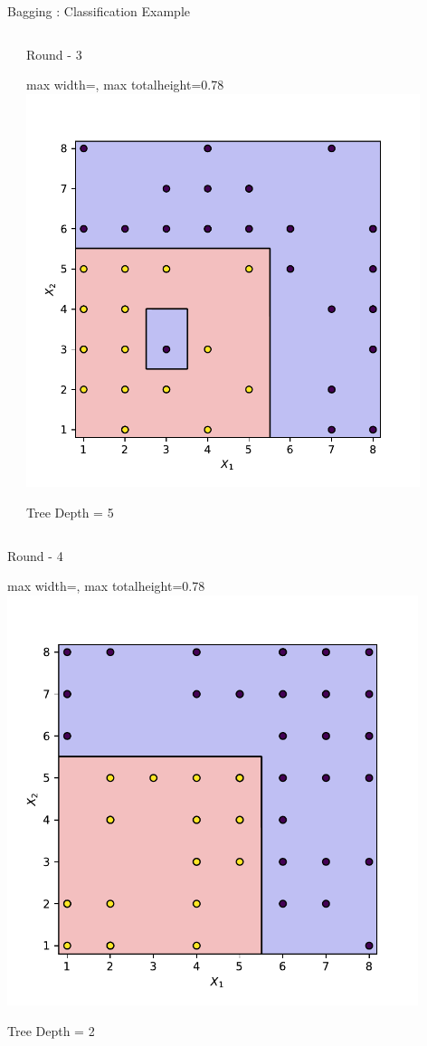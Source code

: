 \documentclass[10pt]{beamer}
\newcommand{\fitpic}[1]{\begin{adjustbox}{max width=\linewidth, max totalheight=0.78\textheight}#1\end{adjustbox}}
\begin{document}
\begin{frame}{Bagging : Classification Example}
\begin{columns}
\begin{column}{0.3\textwidth}
    \end{column}
    \pause  \begin{column}{0.3\textwidth}
      \centering
      Round - 3\\

      \fitpic{\includegraphics[width = 0.9\textwidth]{../assets/ensemble/figures/decision-boundary-2}}
      Tree Depth = 5

    \end{column}

  \end{columns}
  \vspace{0.5cm}
  \pause  \begin{columns}
    \begin{column}{0.3\textwidth}
      \centering
      Round - 4\\

      \fitpic{\includegraphics[width = 0.9\textwidth]{../assets/ensemble/figures/decision-boundary-3}}
      Tree Depth = 2


\end{column}
\end{columns}
\end{frame}
\end{document}
